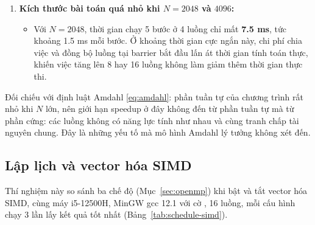 \begin{enumerate}
\begin{itemize}
\end{itemize}
\item \textbf{Kích thước bài toán quá nhỏ khi $N=2048$ và $4096$:}
\begin{itemize}
\item Với $N=2048$, thời gian chạy 5 bước ở 4 luồng chỉ mất \textbf{7.5 ms}, tức khoảng 1.5 ms mỗi bước. Ở khoảng thời gian cực ngắn này, chi phí chia việc và đồng bộ luồng tại barrier bắt đầu lấn át thời gian tính toán thực, khiến việc tăng lên 8 hay 16 luồng không làm giảm thêm thời gian thực thi.
\end{itemize}
\end{enumerate}

Đối chiếu với định luật Amdahl \eqref{eq:amdahl}: phần tuần tự của chương trình rất nhỏ khi $N$ lớn, nên giới hạn speedup ở đây không đến từ phần tuần tự mà từ phần cứng: các luồng không có năng lực tính như nhau và cùng tranh chấp tài nguyên chung. Đây là những yếu tố mà mô hình Amdahl lý tưởng không xét đến.

\subsection{Lập lịch và vector hóa SIMD}

Thí nghiệm này so sánh ba chế độ  (Mục~\ref{sec:openmp}) khi bật và tắt vector hóa SIMD, cùng máy i5-12500H, MinGW gcc 12.1 với cờ , 16 luồng, mỗi cấu hình chạy 3 lần lấy kết quả tốt nhất (Bảng~\ref{tab:schedule-simd}).

